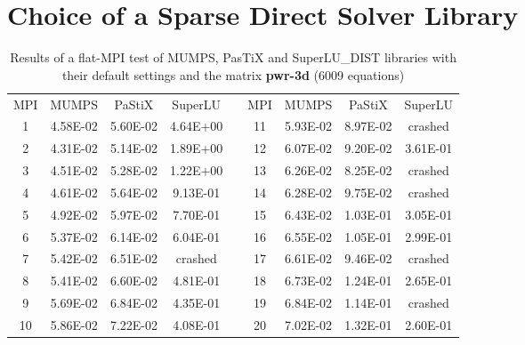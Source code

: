 \chapter{Choice of a Sparse Direct Solver Library}
\label{app:app-lc}

\begin{table}[ht]
\centering
\begin{tabular}{|c|c|c|c|l|c|c|c|c|}
\cline{1-4} \cline{6-9}
MPI & MUMPS    & PaStiX   & SuperLU  &  & MPI & MUMPS    & PaStiX   & SuperLU  \\ \cline{1-4} \cline{6-9} 
1   & 4.58E-02 & 5.60E-02 & 4.64E+00 &  & 11  & 5.93E-02 & 8.97E-02 & crashed  \\ \cline{1-4} \cline{6-9} 
2   & 4.31E-02 & 5.14E-02 & 1.89E+00 &  & 12  & 6.07E-02 & 9.20E-02 & 3.61E-01 \\ \cline{1-4} \cline{6-9} 
3   & 4.51E-02 & 5.28E-02 & 1.22E+00 &  & 13  & 6.26E-02 & 8.25E-02 & crashed  \\ \cline{1-4} \cline{6-9} 
4   & 4.61E-02 & 5.64E-02 & 9.13E-01 &  & 14  & 6.28E-02 & 9.75E-02 & crashed  \\ \cline{1-4} \cline{6-9} 
5   & 4.92E-02 & 5.97E-02 & 7.70E-01 &  & 15  & 6.43E-02 & 1.03E-01 & 3.05E-01 \\ \cline{1-4} \cline{6-9} 
6   & 5.37E-02 & 6.14E-02 & 6.04E-01 &  & 16  & 6.55E-02 & 1.05E-01 & 2.99E-01 \\ \cline{1-4} \cline{6-9} 
7   & 5.42E-02 & 6.51E-02 & crashed  &  & 17  & 6.61E-02 & 9.46E-02 & crashed  \\ \cline{1-4} \cline{6-9} 
8   & 5.41E-02 & 6.60E-02 & 4.81E-01 &  & 18  & 6.73E-02 & 1.24E-01 & 2.65E-01 \\ \cline{1-4} \cline{6-9} 
9   & 5.69E-02 & 6.84E-02 & 4.35E-01 &  & 19  & 6.84E-02 & 1.14E-01 & crashed  \\ \cline{1-4} \cline{6-9} 
10  & 5.86E-02 & 7.22E-02 & 4.08E-01 &  & 20  & 7.02E-02 & 1.32E-01 & 2.60E-01 \\ \cline{1-4} \cline{6-9} 
\end{tabular}
\caption{Results of a flat-MPI test of MUMPS, PasTiX and SuperLU\_DIST libraries with their default settings and the matrix \textbf{pwr-3d} (6009 equations)}
\label{table:app-lc-pwr-3d-result}
\end{table}

